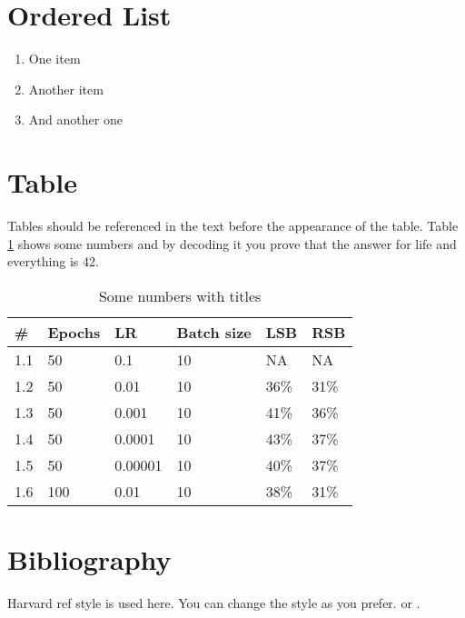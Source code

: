 \section{Ordered List}

\begin{enumerate}
	\item One item
	\item Another item
	\item And another one
\end{enumerate}

\section{Table}
Tables should be referenced in the text before the appearance of the table. Table \ref{acc_cross} shows some numbers and by decoding it you prove that the answer for life and everything is 42.
\begin{table}[H]
\centering
\caption{Some numbers with titles}
\label{acc_cross}
\vspace{0.4cm}
\begin{tabular}{|l|l|l|l|l|l|}
\hline
\# & Epochs & LR      & Batch size & LSB  & RSB  \\ \hline
1.1  & 50     & 0.1     & 10         & NA   & NA   \\ \hline
1.2  & 50     & 0.01    & 10         & 36\% & 31\% \\ \hline
1.3  & 50     & 0.001   & 10         & 41\% & 36\% \\ \hline
1.4  & 50     & 0.0001  & 10         & 43\% & 37\% \\ \hline
1.5  & 50     & 0.00001 & 10         & 40\% & 37\% \\ \hline
1.6  & 100    & 0.01    & 10         & 38\% & 31\% \\ \hline
\end{tabular}
\end{table}

\section{Bibliography}
Harvard ref style is used here. You can change the style as you prefer. \citep{ban2014} or \citet{ban2014}.